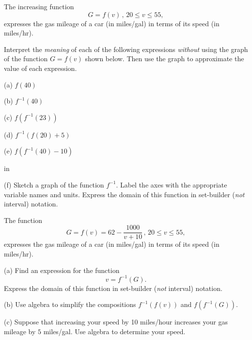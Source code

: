 \documentclass{ximera}
\newcommand{\pskip}{\vskip 0.1 in}
\begin{document}
\begin{example}  \label{Ex:9dfctghgh}
The increasing function
\[
   G = f(v) \,  , \, 20\leq v \leq 55 ,
\]
expresses the gas mileage of a car (in  miles/gal) in terms of its speed (in miles/hr). 

Interpret the \emph{meaning} of each of the following expressions \emph{without} using the graph of the function $G=f(v)$ shown below. Then use the graph to approximate the value of each expression.

(a) $f(40)$

(b) $f^{-1}(40)$

(c) $f(f^{-1}(23))$

(d) $f^{-1}(f(20) + 5)$

(e) $f(f^{-1}(40)-10)$

\begin{onlineOnly}
    \begin{center}
\end{center}
\end{onlineOnly}

\pskip

(f) Sketch a graph of the function $f^{-1}$. Label the axes with the appropriate variable names and units. Express the domain of this function in set-builder (\emph{not} interval) notation.

\end{example}

\begin{example}  \label{Ex:oodfdsfo}
The function
\[
   G = f(v) = 62 - \frac{1000}{v+10}\,  , \, 20\leq v \leq 55 ,
\]
expresses the gas mileage of a car (in  miles/gal) in terms of its speed (in miles/hr). 

(a) Find an expression for the function 
\[
    v = f^{-1}(G).
\]
Express the domain of this function in set-builder (\emph{not} interval) notation.

(b) Use algebra to simplify the compositions $f^{-1}(f(v))$ and $f(f^{-1}(G))$. 
  
(c) Suppose that increasing your speed by 10 miles/hour increases  your gas mileage by $5$ miles/gal. Use algebra to determine your speed.


\end{example}
\end{document}
